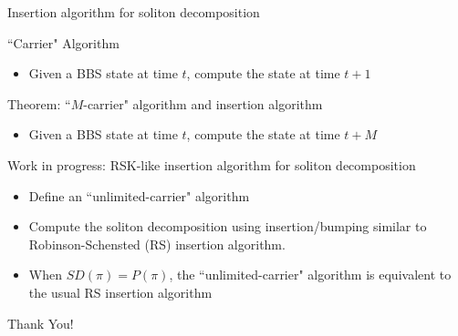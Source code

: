 \documentclass[aspectratio=169, serif]{beamer}
\begin{document}
\begin{frame}{Insertion algorithm for soliton decomposition}
      \begin{block}{``Carrier" Algorithm}
        \begin{itemize}
            \item 
            Given a BBS state at time $t$, compute the state at time $t+1$
        \end{itemize}
        \end{block}

\begin{alertblock}{Theorem:  ``$M$-carrier" algorithm and insertion algorithm}

            \begin{itemize}
            \item 
            Given a BBS state at time $t$, compute the state at time $t+M$
        \end{itemize}
        \end{alertblock}
        

    
    \begin{block}{Work in progress: RSK-like insertion algorithm for soliton decomposition}
            \begin{itemize}
            \item Define an  ``unlimited-carrier" algorithm
            \item Compute the soliton decomposition using insertion/bumping similar to Robinson-Schensted (RS) insertion algorithm.
            \item When $SD(\pi)=P(\pi)$, the ``unlimited-carrier" algorithm is equivalent to the usual RS insertion algorithm
        \end{itemize}
    \end{block}
\end{frame}

\begin{frame}[noframenumbering]%
\Huge
\Centering
        Thank You! 
\end{frame}
%     
\end{document}
